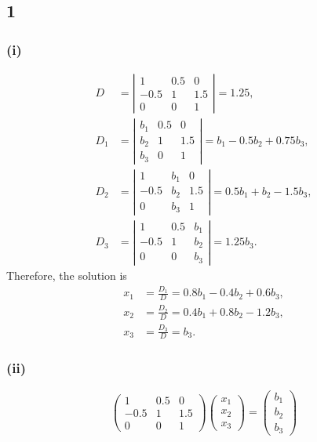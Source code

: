 \documentclass[UTF8]{ctexart}
\begin{document}
\subsection*{1}
\subsubsection*{(i)}
\begin{align*}
    D &= \left|
    \begin{array}{ccc}
        1 & 0.5 & 0 \\
        -0.5 & 1 & 1.5 \\
        0 & 0 & 1
    \end{array} \right|
    = 1.25 , \\
    D_1& = \left|
    \begin{array}{ccc}
        b_1 & 0.5 & 0 \\
        b_2 & 1 & 1.5 \\
        b_3 & 0 & 1
    \end{array} \right|
    = b_1 - 0.5 b_2 + 0.75 b_3 , \\
    D_2 &= \left|
    \begin{array}{ccc}
        1 & b_1 & 0 \\
        -0.5 & b_2 & 1.5 \\
        0 & b_3 & 1
    \end{array} \right|
    =0.5 b_1 + b_2 - 1.5 b_3 , \\
    D_3 &= \left|
    \begin{array}{ccc}
        1 & 0.5 & b_1 \\
        -0.5 & 1 & b_2 \\
        0 & 0 & b_3
    \end{array} \right|
    = 1.25 b_3.
\end{align*}
Therefore, the solution is
\begin{align*}
    x_1 &= \frac{D_1}{D} = 0.8 b_1 - 0.4 b_2 + 0.6 b_3 , \\
    x_2 &= \frac{D_2}{D} = 0.4 b_1 + 0.8 b_2 - 1.2 b_3 , \\
    x_3 &= \frac{D_3}{D} = b_3 .
\end{align*}

\subsubsection*{(ii)}
\[
    \left( \begin{array}{ccc}
        1 & 0.5 & 0 \\
        -0.5 & 1 & 1.5 \\
        0 & 0 & 1
    \end{array} \right)
    \left( \begin{array}{c}
        x_1 \\ x_2 \\ x_3
    \end{array} \right)
    =
    \left( \begin{array}{c}
        b_1 \\ b_2 \\ b_3
    \end{array} \right)
\]
\end{document}
